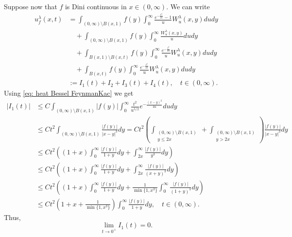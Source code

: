 \documentclass[a4paper,10pt, reqno]{amsart}
\theoremstyle{definition}
\theoremstyle{remark}
\numberwithin{equation}{section}
\begin{document}
Suppose now that $f$ is Dini continuous in $x\in (0,\infty)$. We can write 
\begin{align}\label{L0}
u_f^\lambda (x,t)&=\int_{(0,\infty)\setminus B(x,1)}f(y)\int_0^\infty \frac{e^{-\frac{t^2}{4u}}-1}{u}W_u^\lambda (x,y)dudy\nonumber\\
&\quad +\int_{(0,\infty)\setminus B(x,1)}f(y)\int_0^\infty \frac{W_u^\lambda (x,y)}{u}dudy\nonumber\\
&\quad +\int_{B(x,1)\setminus B(x,t)}f(y)\int_0^\infty \frac{e^{-\frac{t^2}{4u}}}{u}W_u^\lambda (x,y)dudy\nonumber\\
&\quad +\int_{B(x,t)}f(y)\int_0^\infty \frac{e^{-\frac{t^2}{4u}}}{u}W_u^\lambda (x,y)dudy\nonumber\\
&:=I_1(t)+I_2+I_3(t)+I_4(t),\quad t\in (0,\infty).
\end{align}
Using \eqref{eq: heat Bessel FeynmanKac} we get
\begin{align*}
  |I_1(t)|&\leq C\int_{(0,\infty)\setminus B(x,1)}|f(y)|\int_0^\infty \frac{t^2}{u^{5/2}}e^{-\frac{(x-y)^2}{4u}}dudy\\
&\leq Ct^2\int_{(0,\infty)\setminus B(x,1)}\frac{|f(y)|}{|x-y|^3}dy= Ct^2\left(\int_{\substack{(0,\infty)\setminus B(x,1)\\y\leq 2x}}+\int_{\substack{(0,\infty)\setminus B(x,1)\\ y>2x}}\right)\frac{|f(y)|}{|x-y|^3}dy\\
&\leq Ct^2\left((1+x)\int_0^\infty \frac{|f(y)|}{1+y}dy+\int_{2x}^\infty \frac{|f(y)|}{y^3}dy\right)\\
&\leq Ct^2\left((1+x)\int_0^\infty \frac{|f(y)|}{1+y}dy+\int_{2x}^\infty \frac{|f(y)|}{(x+y)^3}dy\right)\\
&\leq Ct^2\left((1+x)\int_0^\infty \frac{|f(y)|}{1+y}dy+\frac{1}{\min\{1,x^3\}}\int_0^\infty \frac{|f(y)|}{(1+y)^3}dy\right)\\
&\leq Ct^2\left(1+x+\frac{1}{\min\{1,x^3\}}\right)\int_0^\infty \frac{|f(y)|}{1+y}dy,\quad t\in (0,\infty).
\end{align*}
Thus,
\begin{equation}\label{L1}
\lim_{t\rightarrow 0^+}I_1(t)=0.
\end{equation}
\end{document}
